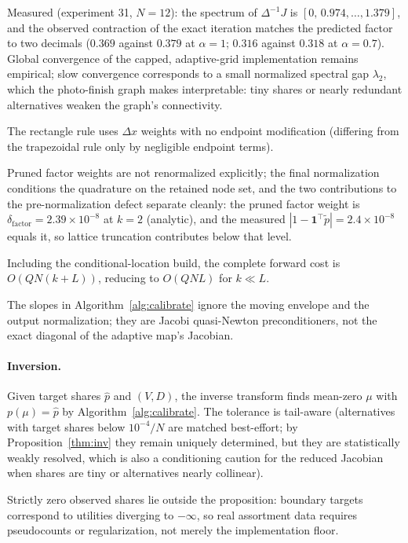 \documentclass[12pt]{article}
\theoremstyle{remark}
\begin{document}
Measured (experiment 31, $N = 12$): the spectrum of $\Delta^{-1}J$ is
$[0,\, 0.974, \dots, 1.379]$, and the observed contraction of the
exact iteration matches the predicted factor to two decimals ($0.369$
against $0.379$ at $\alpha = 1$; $0.316$ against $0.318$ at $\alpha =
0.7$). Global convergence of the capped, adaptive-grid implementation
remains empirical; slow convergence corresponds to a small normalized
spectral gap $\lambda_2$, which the photo-finish graph makes
interpretable: tiny shares or nearly redundant alternatives weaken the
graph's connectivity.

The rectangle rule uses $\Delta x$ weights with no endpoint modification
(differing from the trapezoidal rule only by negligible endpoint terms).

Pruned factor weights are not renormalized explicitly; the final
normalization conditions the quadrature on the retained node set, and the
two contributions to the pre-normalization defect separate cleanly: the
pruned factor weight is $\delta_{\mathrm{factor}} = 2.39\times10^{-8}$
at $k=2$ (analytic), and the measured $|1 - \mathbf{1}^\top \tilde p| =
2.4\times10^{-8}$ equals it, so lattice truncation contributes below that
level.

Including the conditional-location build, the complete forward cost
is $O(QN(k+L))$, reducing to $O(QNL)$ for $k \ll L$.

The slopes in
Algorithm~\ref{alg:calibrate} ignore the moving envelope and the output
normalization; they are Jacobi quasi-Newton preconditioners, not the exact
diagonal of the adaptive map's Jacobian.

\paragraph{Inversion.} Given target shares $\hat p$ and $(V, D)$, the
inverse transform finds mean-zero $\mu$ with $p(\mu) = \hat p$ by
Algorithm~\ref{alg:calibrate}. The tolerance is tail-aware
(alternatives with target shares below $10^{-4}/N$ are matched best-effort;
by Proposition~\ref{thm:inv} they remain uniquely determined, but they are
statistically weakly resolved, which is also a conditioning caution for the
reduced Jacobian when shares are tiny or alternatives nearly collinear).

Strictly zero observed shares lie outside the proposition: boundary targets
correspond to utilities diverging to $-\infty$, so real assortment data
requires pseudocounts or regularization, not merely the implementation
floor.
\end{document}
